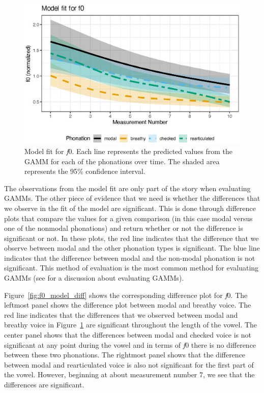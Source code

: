 \begin{figure}[h!]
    \centering
    \includegraphics[width = \linewidth]{images/LCH_GAMMs/f0_model_fit.eps}
    \caption{Model fit for \textit{f}0. Each line represents the predicted values from the GAMM for each of the phonations over time. The shaded area represents the 95\% confidence interval.}
    \label{fig:f0_model_fit}
\end{figure}

The observations from the model fit are only part of the story when evaluating GAMMs. The other piece of evidence that we need is whether the differences that we observe in the fit of the model are significant. This is done through difference plots that compare the values for a given comparison (in this case modal versus one of the nonmodal phonations) and return whether or not the difference is significant or not. In these plots, the red line indicates that the difference that we observe between modal and the other phonation types is significant. The blue line indicates that the difference between modal and the non-modal phonation is not significant. This method of evaluation is the most common method for evaluating GAMMs (see \cite{soskuthyEvaluatingGeneralisedAdditive2021} for a discussion about evaluating GAMMs). 

Figure~\ref{fig:f0_model_diff} shows the corresponding difference plot for \textit{f}0. The leftmost panel shows the difference plot between modal and breathy voice. The red line indicates that the differences that we observed between modal and breathy voice in Figure~\ref{fig:f0_model_fit} are significant throughout the length of the vowel. The center panel shows that the differences between modal and checked voice is not significant at any point during the vowel and in terms of \textit{f}0 there is no difference between these two phonations. The rightmost panel shows that the difference between modal and rearticulated voice is also not significant for the first part of the vowel. However, beginning at about measurement number 7, we see that the differences are significant.


